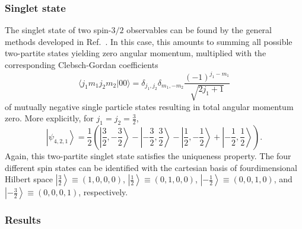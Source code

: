 \documentclass[pra,amsfonts,showpacs,showkeys,preprint]{revtex4}
\begin{document}
\subsubsection*{Singlet state}

The singlet state of two spin-$3/2$ observables
can be found by the general methods developed in Ref.~\cite{schimpf-svozil}.
In this case, this amounts to summing all possible two-partite states yielding zero angular momentum,
multiplied with the corresponding  Clebsch-Gordan coefficients
\begin{equation}
\langle j_1m_1j_2m_2\vert 00\rangle = \delta_{j_1,j_2}  \delta_{m_1,-m_2} \frac{(-1)^{j_1-m_1}}{\sqrt{2j_1+1}}
\label{2009-gtq-cgordon0}
\end{equation}
of mutually negative single particle states resulting in total angular momentum zero.
More explicitly,  for $j_1=j_2=\frac{3}{2}$,
\begin{equation}
\left|  \left. \psi_{4,2,1} \right\rangle  \right. =
\frac{1}{2} \left(
\left| \left. \frac{3}{2}, -\frac{3}{2}\right\rangle \right.
 - \left| \left.  -\frac{3}{2}, \frac{3}{2}\right\rangle    \right.
- \left| \left.  \frac{1}{2}, -\frac{1}{2}\right\rangle  \right.
+ \left| \left.  -\frac{1}{2}, \frac{1}{2}\right\rangle   \right.
\right).
\end{equation}
Again, this two-partite singlet state satisfies the uniqueness property.
The four different spin states can be identified with the cartesian basis of fourdimensional Hilbert space
$\left| \left. \frac{3}{2}\right\rangle \right. \equiv (1,0,0,0)$,
$\left| \left. \frac{1}{2}\right\rangle \right. \equiv (0,1,0,0)$,
$\left| \left. -\frac{1}{2}\right\rangle \right. \equiv (0,0,1,0)$,
and
$\left| \left. -\frac{3}{2}\right\rangle \right. \equiv (0,0,0,1)$,
respectively.

\subsubsection*{Results}
\end{document}
